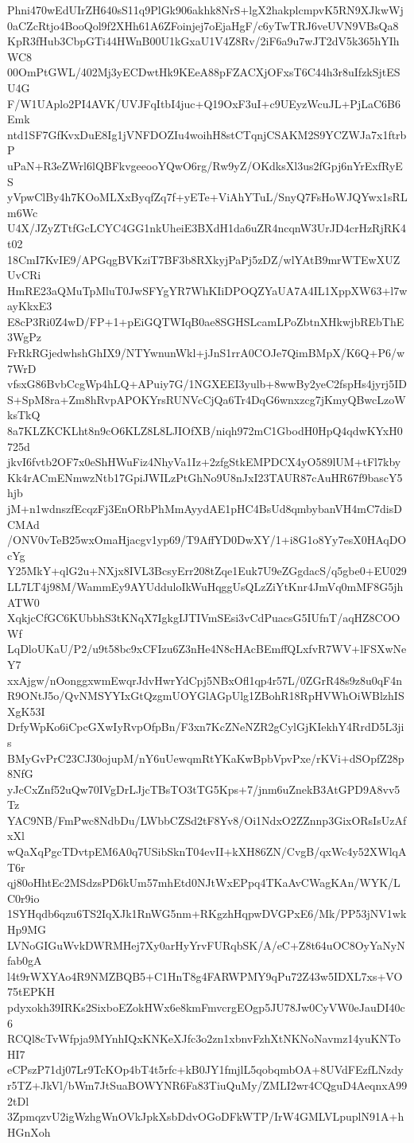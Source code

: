 Phni470wEdUIrZH640sS11q9PlGk906akhk8NrS+lgX2hakplcmpvK5RN9XJkwWj
0aCZcRtjo4BooQol9f2XHh61A6ZFoinjej7oEjaHgF/c6yTwTRJ6veUVN9VBsQa8
KpR3fHub3CbpGTi44HWnB00U1kGxaU1V4Z8Rv/2iF6a9u7wJT2dV5k365hYIhWC8
00OmPtGWL/402Mj3yECDwtHk9KEeA88pFZACXjOFxsT6C44h3r8uIfzkSjtESU4G
F/W1UAplo2PI4AVK/UVJFqItbI4juc+Q19OxF3uI+c9UEyzWcuJL+PjLaC6B6Emk
ntd1SF7GfKvxDuE8Ig1jVNFDOZIu4woihH8stCTqnjCSAKM2S9YCZWJa7x1ftrbP
uPaN+R3eZWrl6lQBFkvgeeooYQwO6rg/Rw9yZ/OKdksXl3us2fGpj6nYrExfRyES
yVpwClBy4h7KOoMLXxByqfZq7f+yETe+ViAhYTuL/SnyQ7FsHoWJQYwx1sRLm6Wc
U4X/JZyZTtfGcLCYC4GG1nkUheiE3BXdH1da6uZR4ncqnW3UrJD4crHzRjRK4t02
18CmI7KvIE9/APGqgBVKziT7BF3b8RXkyjPaPj5zDZ/wlYAtB9mrWTEwXUZUvCRi
HmRE23aQMuTpMluT0JwSFYgYR7WhKIiDPOQZYaUA7A4IL1XppXW63+l7wayKkxE3
E8cP3Ri0Z4wD/FP+1+pEiGQTWIqB0ae8SGHSLcamLPoZbtnXHkwjbREbThE3WgPz
FrRkRGjedwhshGhIX9/NTYwnunWkl+jJnS1rrA0COJe7QimBMpX/K6Q+P6/w7WrD
vfsxG86BvbCcgWp4hLQ+APuiy7G/1NGXEEI3yulb+8wwBy2yeC2fspHs4jyrj5ID
S+SpM8ra+Zm8hRvpAPOKYrsRUNVcCjQa6Tr4DqG6wnxzcg7jKmyQBwcLzoWksTkQ
8a7KLZKCKLht8n9cO6KLZ8L8LJIOfXB/niqh972mC1GbodH0HpQ4qdwKYxH0725d
jkvI6fvtb2OF7x0eShHWuFiz4NhyVa1Iz+2zfgStkEMPDCX4yO589lUM+tFl7kby
Kk4rACmENmwzNtb17GpiJWILzPtGhNo9U8nJxI23TAUR87cAuHR67f9bascY5hjb
jM+n1wdnszfEcqzFj3EnORbPhMmAyydAE1pHC4BsUd8qmbybanVH4mC7disDCMAd
/ONV0vTeB25wxOmaHjacgv1yp69/T9AffYD0DwXY/1+i8G1o8Yy7esX0HAqDOcYg
Y25MkY+qlG2u+NXjx8IVL3BcsyErr208tZqe1Euk7U9eZGgdacS/q5gbe0+EU029
LL7LT4j98M/WammEy9AYUdduloIkWuHqggUsQLzZiYtKnr4JmVq0mMF8G5jhATW0
XqkjcCfGC6KUbbhS3tKNqX7IgkgIJTIVmSEsi3vCdPuacsG5IUfnT/aqHZ8COOWf
LqDloUKaU/P2/u9t58bc9xCFIzu6Z3nHe4N8cHAcBEmffQLxfvR7WV+lFSXwNeY7
xxAjgw/nOonggxwmEwqrJdvHwrYdCpj5NBxOfl1qp4r57L/0ZGrR48s9z8u0qF4n
R9ONtJ5o/QvNMSYYIxGtQzgmUOYGlAGpUlg1ZBohR18RpHVWhOiWBlzhISXgK53I
DrfyWpKo6iCpcGXwIyRvpOfpBn/F3xn7KcZNeNZR2gCylGjKIekhY4RrdD5L3jis
BMyGvPrC23CJ30ojupM/nY6uUewqmRtYKaKwBpbVpvPxe/rKVi+dSOpfZ28p8NfG
yJcCxZnf52uQw70IVgDrLJjcTBsTO3tTG5Kps+7/jnm6uZnekB3AtGPD9A8vv5Tz
YAC9NB/FmPwc8NdbDu/LWbbCZSd2tF8Yv8/Oi1NdxO2ZZnnp3GixORsIsUzAfxXl
wQaXqPgcTDvtpEM6A0q7USibSknT04evII+kXH86ZN/CvgB/qxWc4y52XWlqAT6r
qj80oHhtEc2MSdzsPD6kUm57mhEtd0NJtWxEPpq4TKaAvCWagKAn/WYK/LC0r9io
1SYHqdb6qzu6TS2IqXJk1RnWG5nm+RKgzhHqpwDVGPxE6/Mk/PP53jNV1wkHp9MG
LVNoGIGuWvkDWRMHej7Xy0arHyYrvFURqbSK/A/eC+Z8t64uOC8OyYaNyNfab0gA
l4t9rWXYAo4R9NMZBQB5+C1HnT8g4FARWPMY9qPu72Z43w5IDXL7xs+VO75tEPKH
pdyxokh39IRKs2SixboEZokHWx6e8kmFmvcrgEOgp5JU78Jw0CyVW0eJauDI40c6
RCQl8cTvWfpja9MYnhIQxKNKeXJfc3o2zn1xbnvFzhXtNKNoNavmz14yuKNToHI7
eCPszP71dj07Lr9TcKOp4bT4t5rfc+kB0JY1fmjlL5qobqmbOA+8UVdFEzfLNzdy
r5TZ+JkVl/bWm7JtSuaBOWYNR6Fa83TiuQuMy/ZMLI2wr4CQguD4AeqnxA992tDl
3ZpmqzvU2igWzhgWnOVkJpkXsbDdvOGoDFkWTP/IrW4GMLVLpuplN91A+hHGnXoh
